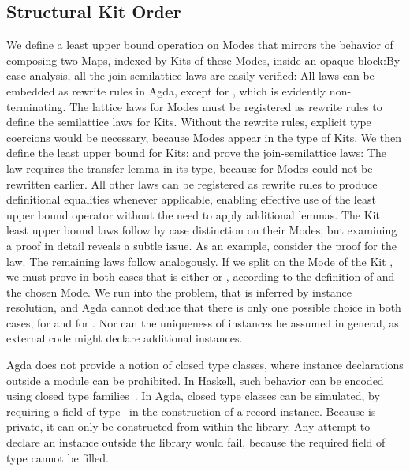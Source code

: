 \documentclass[screen,nonacm]{acmart}
\begin{document}
\subsection{Structural Kit Order}\label{sec:ags-sko}
We define a least upper bound operation on Modes that mirrors the behavior of
composing two Maps, indexed by Kits of these Modes, inside an opaque
block:\AModeLub{}By case analysis, all the join-semilattice laws are easily
verified: \AModeLubLaws{}All laws can be embedded as rewrite rules in Agda,
except for , which is evidently non-terminating. The
lattice laws for Modes must be registered as rewrite rules to define the
semilattice laws for Kits. Without the rewrite rules, explicit type coercions
would be necessary, because Modes appear in the type of Kits. We then define
the least upper bound for Kits: \AKitLub{}and prove the join-semilattice laws:
\AKitLubLaws{}The  law requires the transfer lemma in its
type, because  for Modes could not be rewritten earlier.
All other laws can be registered as rewrite rules to produce definitional
equalities whenever applicable, enabling effective use of the least upper bound
operator without the need to apply additional lemmas. The Kit least upper bound
laws follow by case distinction on their Modes, but examining a proof in detail
reveals a subtle issue. As an example, consider the proof for the
 law. The remaining laws follow analogously.
\AKitLubExcerpt{}If we split on the Mode  of the Kit
, we must prove in both cases that  is either
 or , according to the definition of
 and the chosen Mode. We run into the problem, that
 is inferred by instance resolution, and Agda cannot deduce that
there is only one possible choice in both cases,  for
 and  for
. Nor can the uniqueness of instances be assumed
in general, as external code might declare additional instances.

Agda does not provide a notion of closed type classes, where instance
declarations outside a module can be prohibited. In Haskell, such behavior can
be encoded using closed type families~\cite{10.1145/2578855.2535856}. In Agda,
closed type classes can be simulated, by requiring a field \ALockField{} of
type \ALock\ in the construction of a record instance. Because
 is private, it can only be constructed from within the
library. Any attempt to declare an instance outside the library would fail,
because the required field  of type 
cannot be filled.
\end{document}
